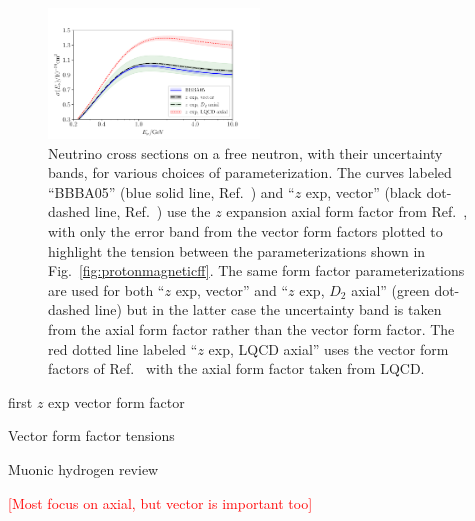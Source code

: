 \begin{figure}[hbt!]
 \centering
 \includegraphics[width=0.5\textwidth]{plots/xsec_comparison-standalone.pdf}
\caption{
 Neutrino cross sections on a free neutron, with their uncertainty bands,
 for various choices of parameterization.
 The curves labeled ``BBBA05'' (blue solid line, Ref.~\cite{Bradford:2006yz})
 and ``$z$ exp, vector'' (black dot-dashed line, Ref.~\cite{Borah:2020gte}) use the
 $z$ expansion axial form factor from Ref.~\cite{Meyer:2016oeg},
 with only the error band from the vector form factors plotted
 to highlight the tension between the parameterizations shown in Fig.~\ref{fig:protonmagneticff}.
 The same form factor parameterizations are used for both ``$z$ exp, vector'' and
 ``$z$ exp, $D_{2}$ axial'' (green dot-dashed line)
 but in the latter case the uncertainty band is taken from the axial form factor
 rather than the vector form factor.
 The red dotted line labeled ``$z$ exp, LQCD axial'' uses the vector form factors
 of Ref.~\cite{Borah:2020gte} with the axial form factor taken from LQCD.
 \label{fig:nucleonxsec}
}
\end{figure}

\begin{description}
\item[first $z$ exp vector form factor] \cite{Ye:2017gyb}
\item[Vector form factor tensions] \cite{Borah:2020gte}
\item[Muonic hydrogen review] \cite{Hill:2017wgb}
\end{description}

\textcolor{red}{[Most focus on axial, but vector is important too]}


